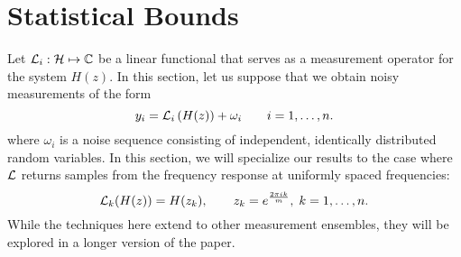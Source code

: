 \section{Statistical Bounds}\label{sec:statistics}
Let $\mathcal{L}_i: \mathcal{H} \mapsto \mathbb{C} $ be a linear functional that serves as a measurement operator for the system $H(z)$.  In this section, let us suppose that we obtain noisy measurements of the form
$$
y_i=\mathcal{L}_i \left( H(z) \right) +\omega_i \qquad i=1, \ldots, n.
$$
where $\omega_i$ is a noise sequence consisting of independent, identically distributed random variables.  In this section, we will specialize our results to the case where $\mathcal{L}$ returns samples from the frequency response at uniformly spaced frequencies:
$$
\mathcal{L}_k(H(z))=H(z_k), \qquad z_k=e^{\frac{2 \pi i k}{m} }, \; k=1, \ldots, n.
$$
While the techniques here extend to other measurement ensembles, they will be explored in a longer version of the paper.
%
%

